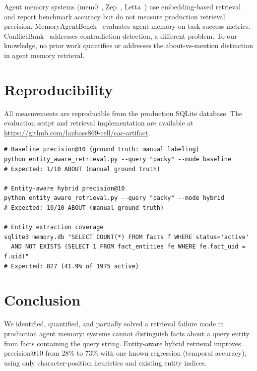 \documentclass[11pt]{article}
\begin{document}
Agent memory systems (mem0~\cite{mem0}, Zep~\cite{zep}, Letta~\cite{letta}) use embedding-based retrieval and report benchmark accuracy but do not measure production retrieval precision. MemoryAgentBench~\cite{mab} evaluates agent memory on task success metrics. ConflictBank~\cite{conflictbank} addresses contradiction detection, a different problem. To our knowledge, no prior work quantifies or addresses the about-vs-mention distinction in agent memory retrieval.

\section{Reproducibility}

All measurements are reproducible from the production SQLite database. The evaluation script and retrieval implementation are available at \url{https://github.com/lanbass869-cell/cac-artifact}.

\begin{verbatim}
# Baseline precision@10 (ground truth: manual labeling)
python entity_aware_retrieval.py --query "packy" --mode baseline
# Expected: 1/10 ABOUT (manual ground truth)

# Entity-aware hybrid precision@10
python entity_aware_retrieval.py --query "packy" --mode hybrid
# Expected: 10/10 ABOUT (manual ground truth)

# Entity extraction coverage
sqlite3 memory.db "SELECT COUNT(*) FROM facts f WHERE status='active'
  AND NOT EXISTS (SELECT 1 FROM fact_entities fe WHERE fe.fact_uid = f.uid)"
# Expected: 827 (41.9% of 1975 active)
\end{verbatim}

\section{Conclusion}

We identified, quantified, and partially solved a retrieval failure mode in production agent memory: systems cannot distinguish facts about a query entity from facts containing the query string. Entity-aware hybrid retrieval improves precision@10 from 28\% to 73\% with one known regression (temporal accuracy), using only character-position heuristics and existing entity indices.
\end{document}
